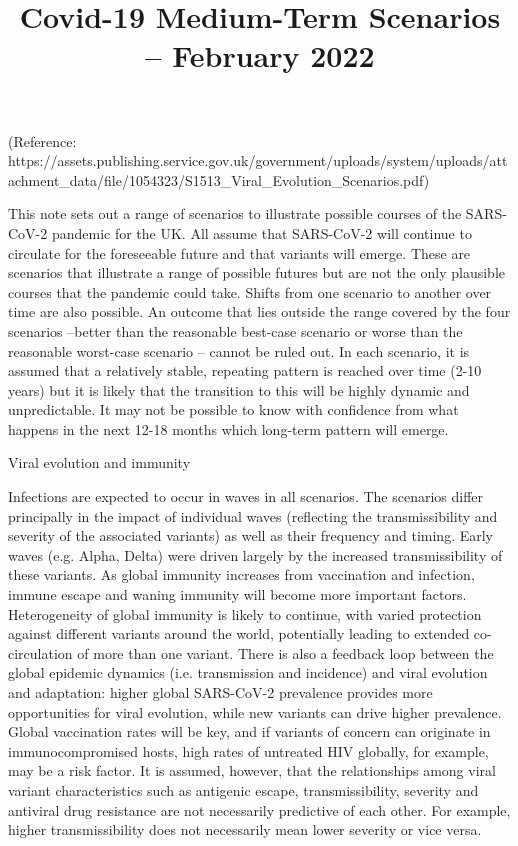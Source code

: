 \documentclass{article}
\begin{document}
\title{Covid-19 Medium-Term Scenarios – February 2022}

\maketitle





(Reference: https://assets.publishing.service.gov.uk/government/uploads/system/uploads/attachment\_data/file/1054323/S1513\_Viral\_Evolution\_Scenarios.pdf)


This note sets out a range of scenarios to illustrate possible courses of the SARS-CoV-2 pandemic for the UK. All assume that SARS-CoV-2 will continue to circulate for the foreseeable future and that variants will emerge. These are scenarios that illustrate a range of possible futures but are not the only plausible courses that the pandemic could take. Shifts from one scenario to another over time are also possible. An outcome that lies outside the range covered by the four scenarios –better than the reasonable best-case scenario or worse than the reasonable worst-case scenario – cannot be ruled out. In each scenario, it is assumed that a relatively stable, repeating pattern is reached over time (2-10 years) but it is likely that the transition to this will be highly dynamic and unpredictable. It may not be possible to know with confidence from what happens in the next 12-18 months which long-term pattern will emerge. 


Viral evolution and immunity 


Infections are expected to occur in waves in all scenarios. The scenarios differ principally in the impact of individual waves (reflecting the transmissibility and severity of the associated variants) as well as their frequency and timing. Early waves (e.g. Alpha, Delta) were driven largely by the increased transmissibility of these variants. As global immunity increases from vaccination and infection, immune escape and waning immunity will become more important factors. Heterogeneity of global immunity is likely to continue, with varied protection against different variants around the world, potentially leading to extended co-circulation of more than one variant. There is also a feedback loop between the global epidemic dynamics (i.e. transmission and incidence) and viral evolution and adaptation: higher global SARS-CoV-2 prevalence provides more opportunities for viral evolution, while new variants can drive higher prevalence. Global vaccination rates will be key, and if variants of concern can originate in immunocompromised hosts, high rates of untreated HIV globally, for example, may be a risk factor. It is assumed, however, that the relationships among viral variant characteristics such as antigenic escape, transmissibility, severity and antiviral drug resistance are not necessarily predictive of each other. For example, higher transmissibility does not necessarily mean lower severity or vice versa. 
\end{document}
